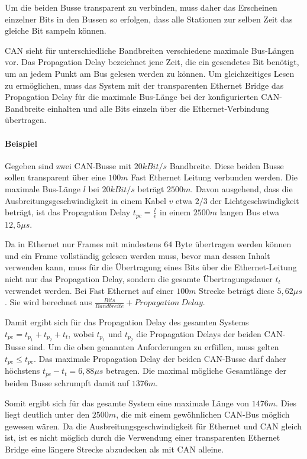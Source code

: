 Um die beiden Busse transparent zu verbinden, muss daher das Erscheinen einzelner
Bits in den Bussen so erfolgen, dass alle Stationen zur selben Zeit das gleiche Bit
sampeln können.

CAN sieht für unterschiedliche Bandbreiten verschiedene maximale Bus-Längen vor. Das
Propagation Delay bezeichnet jene Zeit, die ein gesendetes Bit benötigt, um an jedem
Punkt am Bus gelesen werden zu können. Um gleichzeitiges Lesen zu ermöglichen, muss
das System mit der transparenten Ethernet Bridge das Propagation Delay für die
maximale Bus-Länge bei der konfigurierten CAN-Bandbreite einhalten und alle Bits
einzeln über die Ethernet-Verbindung übertragen.

\paragraph{Beispiel}
Gegeben sind zwei CAN-Busse mit $20 kBit/s$ Bandbreite. Diese beiden Busse sollen
transparent über eine $100 m$ Fast Ethernet Leitung verbunden werden. Die maximale
Bus-Länge $l$ bei $20 kBit/s$ beträgt $2500 m$. Davon ausgehend, dass die
Ausbreitungsgeschwindigkeit in einem Kabel $v$ etwa $2/3$ der Lichtgeschwindigkeit beträgt,
ist das Propagation Delay $t_{pc} = \frac{l}{v}$ in einem $2500 m$ langen Bus etwa
$12,5 \mu s$.

Da in Ethernet nur Frames mit mindestens $64$ Byte übertragen werden können und ein
Frame vollständig gelesen werden muss, bevor man dessen Inhalt verwenden kann, muss
für die Übertragung eines Bits über die Ethernet-Leitung nicht nur das Propagation
Delay, sondern die gesamte Übertragungsdauer $t_t$ verwendet werden. Bei Fast
Ethernet auf einer $100 m$ Strecke beträgt diese $5,62 \mu s$. Sie wird berechnet aus
$\frac{Bits}{Bandbreite} + Propagation\: Delay$.

Damit ergibt sich für das Propagation Delay des gesamten Systems $t_{pe} = t_{p_1} +
t_{p_2} + t_t$, wobei $t_{p_1}$ und $t_{p_2}$ die Propagation Delays der beiden
CAN-Busse sind. Um die oben genannten Anforderungen zu erfüllen, muss gelten $t_{pe}
\leq t_{pc}$. Das maximale Propagation Delay der beiden CAN-Busse darf daher
höchstens $t_{pc} - t_t = 6,88 \mu s$ betragen. Die maximal mögliche Gesamtlänge der
beiden Busse schrumpft damit auf $1376 m$.

Somit ergibt sich für das gesamte System eine maximale Länge von $1476 m$. Dies liegt
deutlich unter den $2500 m$, die mit einem gewöhnlichen CAN-Bus möglich gewesen
wären. Da die Ausbreitungsgeschwindigkeit für Ethernet und CAN gleich ist, ist es
nicht möglich durch die Verwendung einer transparenten Ethernet Bridge eine längere
Strecke abzudecken als mit CAN alleine.

